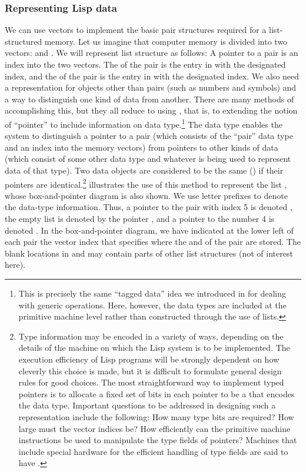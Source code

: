 \subsubsection*{Representing Lisp data}

We can use vectors to implement the basic pair structures required for a
list-structured memory.  Let us imagine that computer memory is divided into
two vectors:  and .  We will represent list
structure as follows: A pointer to a pair is an index into the two vectors.
The  of the pair is the entry in  with the designated
index, and the  of the pair is the entry in  with the
designated index.  We also need a representation for objects other than pairs
(such as numbers and symbols) and a way to distinguish one kind of data from
another.  There are many methods of accomplishing this, but they all reduce to
using , that is, to extending the notion of ``pointer''
to include information on data type.\footnote{This is precisely the same
``tagged data'' idea we introduced in  for dealing with generic
operations.  Here, however, the data types are included at the primitive
machine level rather than constructed through the use of lists.} The data type
enables the system to distinguish a pointer to a pair (which consists of the
``pair'' data type and an index into the memory vectors) from pointers to other
kinds of data (which consist of some other data type and whatever is being used
to represent data of that type).  Two data objects are considered to be the
same () if their pointers are identical.\footnote{Type information
may be encoded in a variety of ways, depending on the details of the machine on
which the Lisp system is to be implemented.  The execution efficiency of Lisp
programs will be strongly dependent on how cleverly this choice is made, but it
is difficult to formulate general design rules for good choices.  The most
straightforward way to implement typed pointers is to allocate a fixed set of
bits in each pointer to be a  that encodes the data type.
Important questions to be addressed in designing such a representation include
the following: How many type bits are required?  How large must the vector
indices be?  How efficiently can the primitive machine instructions be used to
manipulate the type fields of pointers?  Machines that include special hardware
for the efficient handling of type fields are said to have .}  illustrates the use of this method to
represent the list , whose box-and-pointer diagram is also
shown.  We use letter prefixes to denote the data-type information.  Thus, a
pointer to the pair with index 5 is denoted , the empty list is
denoted by the pointer , and a pointer to the number 4 is denoted
.  In the box-and-pointer diagram, we have indicated at the lower left
of each pair the vector index that specifies where the  and
 of the pair are stored.  The blank locations in  and
 may contain parts of other list structures (not of interest
here).

